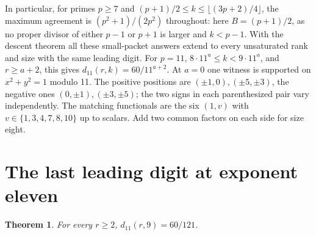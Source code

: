 \documentclass[11pt]{article}
\newtheorem{theorem}{Theorem}[section]
\begin{document}
In particular, for primes $p\ge7$ and $(p+1)/2\le k\le \lfloor(3p+2)/4\rfloor$, the maximum agreement is $(p^2+1)/(2p^2)$ throughout: here $B=(p+1)/2$, as no proper divisor of either $p-1$ or $p+1$ is larger and $k<p-1$. With the descent theorem all these small-packet answers extend to every unsaturated rank and size with the same leading digit. For $p=11$, $8\cdot11^a\le k<9\cdot11^a$, and $r\ge a+2$, this gives $d_{11}(r,k)=60/11^{a+2}$. At $a=0$ one witness is supported on $x^2+y^2=1$ modulo 11. The positive positions are $(\pm1,0),(\pm5,\pm3)$, the negative ones $(0,\pm1),(\pm3,\pm5)$; the two signs in each parenthesized pair vary independently. The matching functionals are the six $(1,v)$ with $v\in\{1,3,4,7,8,10\}$ up to scalars. Add two common factors on each side for size eight.
\section{The last leading digit at exponent eleven}
\begin{theorem}
For every $r\ge2$, $d_{11}(r,9)=60/121$.
\end{theorem}
\end{document}
